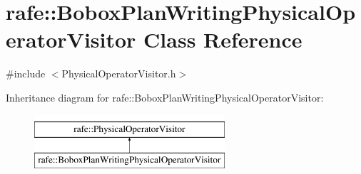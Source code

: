 \hypertarget{classrafe_1_1_bobox_plan_writing_physical_operator_visitor}{\section{rafe\+:\+:Bobox\+Plan\+Writing\+Physical\+Operator\+Visitor Class Reference}
\label{classrafe_1_1_bobox_plan_writing_physical_operator_visitor}
}


{\ttfamily \#include $<$Physical\+Operator\+Visitor.\+h$>$}

Inheritance diagram for rafe\+:\+:Bobox\+Plan\+Writing\+Physical\+Operator\+Visitor\+:\begin{figure}[H]
\begin{center}
\leavevmode
\includegraphics[height=2.000000cm]{classrafe_1_1_bobox_plan_writing_physical_operator_visitor}
\end{center}
\end{figure}
